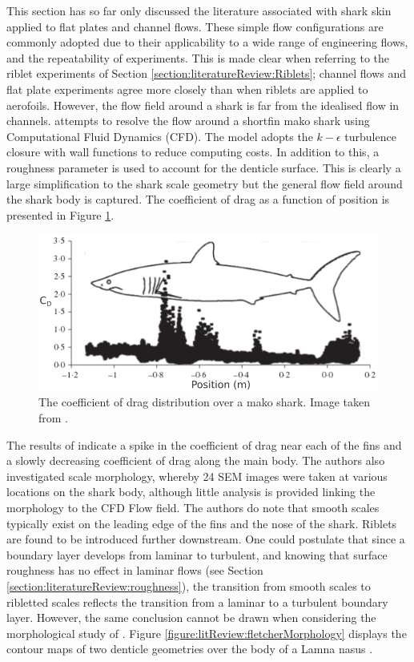\documentclass[12pt,oneside,a4paper]{article}
\begin{document}
This section has so far only discussed the literature associated with shark skin applied to flat plates and channel flows. These simple flow configurations are commonly adopted due to their applicability to a wide range of engineering flows, and the repeatability of experiments. This is made clear when referring to the riblet experiments of Section \ref{section:literatureReview:Riblets}; channel flows and flat plate experiments agree more closely than when riblets are applied to aerofoils. However, the flow field around a shark is far from the idealised flow in channels. \cite{diez2015} attempts to resolve the flow around a shortfin mako shark using Computational Fluid Dynamics (CFD). The model adopts the $k-\epsilon$ turbulence closure with wall functions to reduce computing costs. In addition to this, a roughness parameter is used to account for the denticle surface. This is clearly a large simplification to the shark scale geometry but the general flow field around the shark body is captured. The coefficient of drag as a function of position is presented in Figure \ref{figure:litReview:makoSharkFlowField}.
%
\begin{figure}[!t]
\centering
\includegraphics[width=0.8\linewidth]{images/litReview/makoSharkFlowField.png}
\caption{The coefficient of drag distribution over a mako shark. Image taken from \cite{diez2015}.}
\label{figure:litReview:makoSharkFlowField}
\end{figure}
%
 The results of \cite{diez2015} indicate a spike in the coefficient of drag near each of the fins and a slowly decreasing coefficient of drag along the main body. The authors also investigated scale morphology, whereby 24 SEM images were taken at various locations on the shark body, although little analysis is provided linking the morphology to the CFD Flow field. The authors do note that smooth scales typically exist on the leading edge of the fins and the nose of the shark. Riblets are found to be introduced further downstream. One could postulate that since a boundary layer develops from laminar to turbulent, and knowing that surface roughness has no effect in laminar flows (see Section \ref{section:literatureReview:roughness}), the transition from smooth scales to ribletted scales reflects the transition from a laminar to a turbulent boundary layer. However, the same conclusion cannot be drawn when considering the morphological study of \cite{fletcher2014phd}. Figure \ref{figure:litReview:fletcherMorphology} displays the contour maps of two denticle geometries over the body of a Lamna nasus \citep{fletcher2014phd}. 
\end{document}
